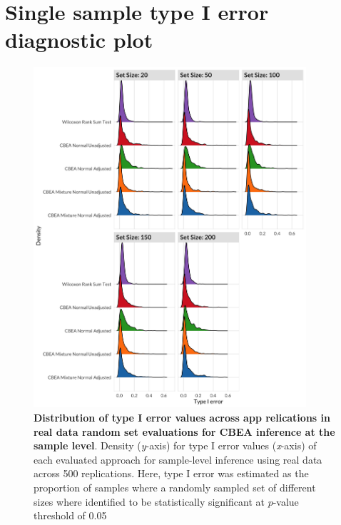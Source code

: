 \documentclass{article}
\begin{document}
\section{Single sample type I error diagnostic plot}
\begin{figure}[!h]
    \centering
    \includegraphics[width=0.9\textwidth]{figures/data_ss_diag_ridges.png}
    \caption{\textbf{Distribution of type I error values across app relications in real data random set evaluations for CBEA inference at the sample level}. Density (\emph{y}-axis) for type I error values (\emph{x}-axis) of each evaluated approach for sample-level inference using real data across 500 replications. Here, type I error was estimated as the proportion of samples where a randomly sampled set of different sizes where identified to be statistically significant at $p$-value threshold of 0.05} 
    \label{fig:s7}
\end{figure}
\end{document}
